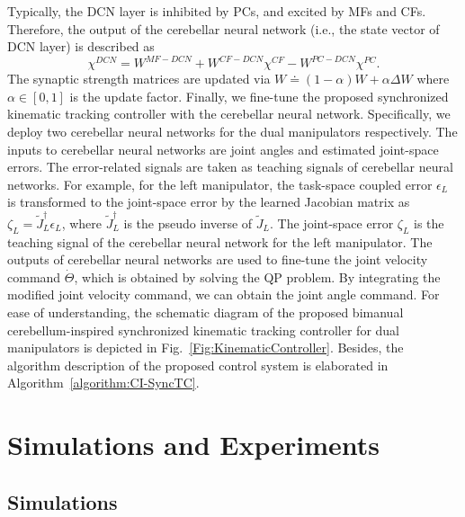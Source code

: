 \documentclass[journal,twoside,web]{ieeecolor}
\begin{document}
Typically, the DCN layer is inhibited by PCs, and excited by MFs and CFs. Therefore, the output of the cerebellar neural network (i.e., the state vector of DCN layer) is described as
\begin{equation}
\chi^{DCN} = W^{MF-DCN} + W^{CF-DCN}\chi^{CF} - W^{PC-DCN}\chi^{PC}.
\label{eq:DCN}
\end{equation}
The synaptic strength matrices are updated via $W \doteq (1-\alpha)W + \alpha \Delta W$ where $\alpha \in [0,1]$ is the update factor. Finally, we fine-tune the proposed synchronized kinematic tracking controller with the cerebellar neural network. Specifically, we deploy two cerebellar neural networks for the dual manipulators respectively. The inputs to cerebellar neural networks are joint angles and estimated joint-space errors. The error-related signals are taken as teaching signals of cerebellar neural networks. For example, for the left manipulator, the task-space coupled error $\epsilon_L$ is transformed to the joint-space error by the learned Jacobian matrix as $\zeta_L = \tilde J_L^\dag \epsilon_L$, where $\tilde J_L^\dag$ is the pseudo inverse of $\tilde J_L$. The joint-space error $\zeta_L$ is the teaching signal of the cerebellar neural network for the left manipulator. The outputs of cerebellar neural networks are used to fine-tune the joint velocity command $\dot{\Theta}$, which is obtained by solving the QP problem. By integrating the modified joint velocity command, we can obtain the joint angle command. For ease of understanding, the schematic diagram of the proposed bimanual cerebellum-inspired synchronized kinematic tracking controller for dual manipulators is depicted in Fig.~\ref{Fig:KinematicController}. Besides, the algorithm description of the proposed control system is elaborated in Algorithm~\ref{algorithm:CI-SyncTC}.



\section{Simulations and Experiments} \label{section:experiment}


\subsection{Simulations}
\end{document}
